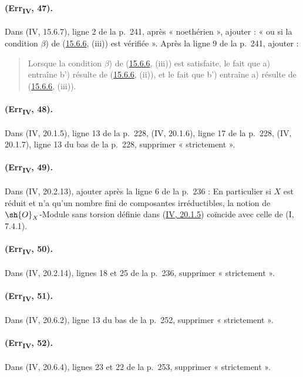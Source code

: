\paragraph{(Err\textsubscript{IV}, 47).}
Dans (IV, 15.6.7), ligne 2 de la p.~241, après « noethérien », ajouter :
« ou si la condition $\beta$) de
({\hyperref[canon-index.ega4.c04.prop.15-6-6]{15.6.6}}, (iii)) est vérifiée ».
Après la ligne 9 de la p.~241, ajouter :
\begin{quote}
Lorsque la condition $\beta$) de
({\hyperref[canon-index.ega4.c04.prop.15-6-6]{15.6.6}}, (iii)) est satisfaite, le
fait que a) entraîne b') résulte de
({\hyperref[canon-index.ega4.c04.prop.15-6-6]{15.6.6}}, (ii)), et le fait que b')
entraîne a) résulte de
({\hyperref[canon-index.ega4.c04.prop.15-6-6]{15.6.6}}, (iii)).
\end{quote}

\paragraph{(Err\textsubscript{IV}, 48).}
Dans (IV, 20.1.5), ligne 13 de la p.~228, (IV, 20.1.6), ligne 17 de la
p.~228, (IV, 20.1.7), ligne 13 du bas de la p.~228, supprimer
« strictement ».

\paragraph{(Err\textsubscript{IV}, 49).}
Dans (IV, 20.2.13), ajouter après la ligne 6 de la p.~236 : En
particulier si $X$ est réduit et n'a qu'un nombre fini de composantes
irréductibles, la notion de $\sh{O}_X$-Module sans torsion définie dans
({\hyperlink{ega4.c04.statement.20-1-5}{IV, 20.1.5}}) coïncide avec
celle de (I, 7.4.1).

\paragraph{(Err\textsubscript{IV}, 50).}
Dans (IV, 20.2.14), lignes 18 et 25 de la p.~236, supprimer
« strictement ».

\paragraph{(Err\textsubscript{IV}, 51).}
Dans (IV, 20.6.2), ligne 13 du bas de la p.~252, supprimer
« strictement ».

\paragraph{(Err\textsubscript{IV}, 52).}
Dans (IV, 20.6.4), lignes 23 et 22 de la p.~253, supprimer
« strictement ».

